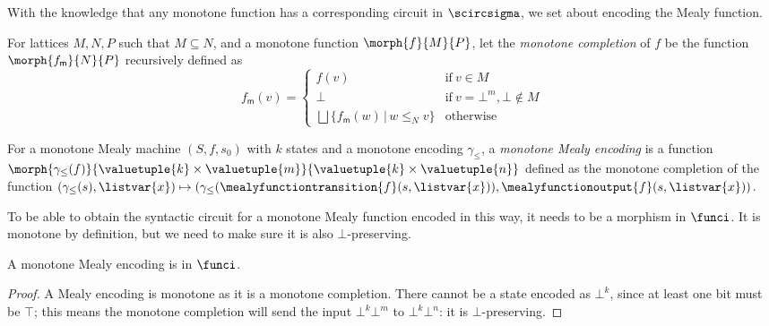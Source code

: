 With the knowledge that any monotone function has a corresponding circuit
in \(\scircsigma\), we set about encoding the Mealy function.

\begin{definition}\label{def:monotone-completion}
    For lattices \(M, N, P\) such that \(M \subseteq N\), and a monotone
    function \(\morph{f}{M}{P}\), let the \emph{monotone completion} of \(f\) be
    the function \(\morph{f_\mathsf{m}}{N}{P}\) recursively defined as \[
        f_\mathsf{m}(v) = \begin{cases}
            f(v)
             &
            \text{if}\ v \in M
            \\
            \bot
             &
            \text{if}\ v = \bot^m, \bot \not\in M
            \\
            \bigsqcup \{ f_\mathsf{m}(w) \,|\, w \leq_N v \}
             &
            \text{otherwise}
        \end{cases}
    \]
\end{definition}

\begin{definition}\label{def:mealy-encoding}
    For a monotone Mealy machine \((S, f, s_0)\) with \(k\) states and a
    monotone encoding \(\gamma_\leq\), a \emph{monotone Mealy encoding} is a
    function
    \(
    \morph{
        \gamma_\leq(f)
    }{
        \valuetuple{k} \times \valuetuple{m}
    }{
        \valuetuple{k} \times \valuetuple{n}
    }
    \) defined as the monotone completion of the function \(
    (\gamma_\leq(s), \listvar{x})
    \mapsto
    (
    \gamma_\leq(\mealyfunctiontransition{f}(s, \listvar{x})),
    \mealyfunctionoutput{f}(s, \listvar{x})
    )
    \).
\end{definition}

To be able to obtain the syntactic circuit for a monotone Mealy function encoded
in this way, it needs to be a morphism in \(\funci\).
It is monotone by definition, but we need to make sure it is also
\(\bot\)-preserving.

\begin{lemma}
    A monotone Mealy encoding is in \(\funci\).
\end{lemma}
\begin{proof}
    A Mealy encoding is monotone as it is a monotone completion.
    There cannot be a state encoded as \(\bot^k\), since at least one bit must
    be \(\top\); this means the monotone completion will send the input
    \(\bot^k\bot^m\) to \(\bot^k\bot^n\): it is
    \(\bot\)-preserving.
\end{proof}

